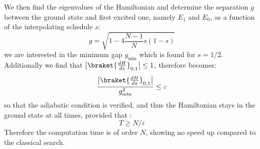     We then find the eigenvalues of the Hamiltonian and determine the separation $g$ between the ground state and first excited one, namely $E_1$ and $E_0$, as a function of the interpolating schedule $s$:
    \begin{equation}
      g=\sqrt{1-4\frac{N-1}{N}s(1-s)}
      \label{separation}
    \end{equation}
    we are interested in the minimum gap $g_{\min}$ which is found for $s=1/2$. Additionally we find that $\big|\braket{\frac{dH}{ds}}_{0,1}\big| \leq 1$, therefore  becomes:
    \begin{equation}
      \frac{\big|\braket{\frac{dH}{ds}}_{0,1}\big|}{g_{\min}^2} \leq \varepsilon
      \label{adiabatic_condition}
    \end{equation}
    so that the adiabatic condition is verified, and thus the Hamiltonian stays in the ground state at all times, provided that :
    \begin{equation}
      T\geq N/\varepsilon
      \label{eq:adiabatic_scaling_global}
    \end{equation}
    Therefore the computation time is of order $N$, showing no speed up compared to the classical search.

